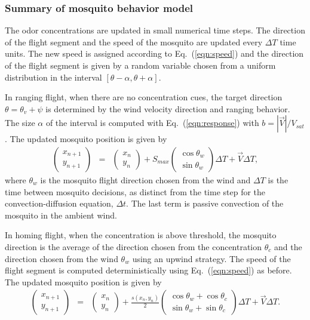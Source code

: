 \documentclass[12pt]{article}
\begin{document}
\subsubsection{Summary of mosquito behavior model}
The odor concentrations are updated in small numerical time steps.  The direction of the flight segment and the speed of the mosquito are updated every $\Delta T$ time units.   The new speed is assigned according to Eq.~(\ref{eqn:speed}) and the direction of the flight segment is given by a random variable chosen from a uniform distribution in the interval $[\theta-\alpha,\theta+\alpha]$.

In ranging flight, when there are no concentration cues, the
target direction $\theta = \theta_v + \psi$ is determined by the wind velocity direction and ranging behavior.  The size $\alpha$ of the interval is
computed with Eq.~(\ref{eqn:response}) with $b = |\vec{V}|/V_{sat}$. The updated mosquito position is given by
\begin{eqnarray}
	\begin{pmatrix} x_{n+1} \\ y_{n+1} \end{pmatrix} &=&
	\begin{pmatrix} x_n \\ y_n \end{pmatrix} + S_{max}\begin{pmatrix}  \cos{\theta_w} \\ \sin{\theta_w} \end{pmatrix}\Delta T  + \vec{V}\Delta T , \label{eq:wind:motion}
\end{eqnarray}
where $\theta_w$ is the mosquito flight direction chosen from the wind and $\Delta T$ is the time between mosquito decisions, as distinct from the time step for the convection-diffusion equation, $\Delta t$. The last term is passive convection of the mosquito in the ambient wind.

In homing flight, when the concentration is above threshold, the mosquito direction is the average of the direction chosen from the concentration $\theta_c$ and the direction chosen from the wind $\theta_w$ using an upwind strategy.
The speed of the flight segment is computed deterministically using Eq.~(\ref{eqn:speed}) as before. The updated mosquito position is given by
\begin{eqnarray}
	\begin{pmatrix} x_{n+1} \\ y_{n+1} \end{pmatrix} &=&
	\begin{pmatrix} x_n \\ y_n \end{pmatrix} + \frac{s(x_n,y_n)}{2} \begin{pmatrix}  \cos{\theta_w} + \cos{\theta_c}\\ \sin{\theta_w} + \sin{\theta_c} \end{pmatrix}\Delta T  + \vec{V}\Delta T . \label{eq:both:motion}
\end{eqnarray}
\end{document}

